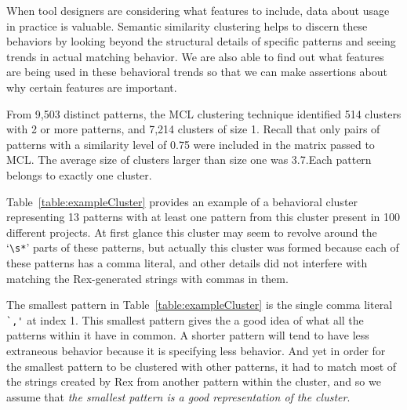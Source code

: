 When tool designers are considering what features to include, data about usage in practice is valuable.  Semantic similarity clustering  helps to discern these behaviors by looking beyond the structural details of specific patterns and seeing trends in actual matching behavior.  We are also able to find out what features are being used in these behavioral trends so that we can make assertions about why certain features are important.

From 9,503 distinct patterns, the MCL clustering technique identified 514 clusters with 2 or more patterns, and 7,214 clusters of size 1.  Recall that only pairs of patterns with a similarity level of 0.75 were included in the matrix passed to MCL.  The average size of clusters larger than size one was 3.7.Each pattern belongs to exactly one cluster.

Table~\ref{table:exampleCluster} provides an example of a behavioral cluster representing 13 patterns with at least one pattern from this cluster present in 100 different projects.  At first glance this cluster may seem to revolve around the `\verb!\s*!' parts of these patterns, but actually this cluster was formed because each of these patterns has a comma literal, and other details did not interfere with matching the Rex-generated strings with commas in them.


The smallest pattern in Table~\ref{table:exampleCluster} is the single comma literal \verb!`,'! at index 1.  This smallest pattern gives the a good idea of what all the patterns within it have in common.  A shorter pattern will tend to have less extraneous behavior because it is specifying less behavior.  And yet in order for the smallest pattern to be clustered with other patterns, it had to match most of the strings created by Rex from another pattern within the cluster, and so we assume that \emph{the smallest pattern is a good representation of the cluster}.

